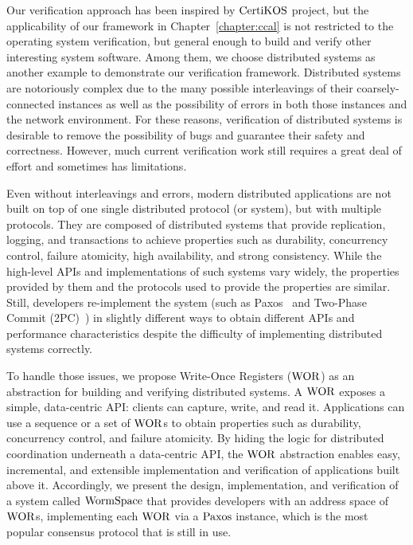 
Our verification approach has been inspired by $\mathrm{CertiKOS}$ project,
but the applicability of our framework in Chapter~\ref{chapter:ccal} is not restricted to the operating system verification, but general enough
to build and verify other interesting system software. 
Among them, we choose distributed systems as another example to demonstrate our 
verification framework.
Distributed systems are notoriously complex due to the many possible interleavings of their coarsely-connected 
instances as well as the possibility of errors in both those instances and the network environment. 
For these reasons, verification of distributed systems is desirable to remove the possibility of bugs and guarantee their safety and correctness. 
However, much current verification work still requires a great deal of effort and sometimes has limitations.

Even without interleavings and errors, 
modern distributed applications are not built on top of one single distributed protocol (or system), but with multiple protocols.
They are composed of distributed systems that provide replication, 
logging, and transactions to achieve properties such as durability, concurrency control, failure atomicity, high availability, and strong consistency.
While the high-level APIs and implementations of such systems vary widely, 
the properties provided by them and the protocols used to provide the properties are similar. 
Still, developers re-implement the system (such as Paxos~\cite{paxos} and 
Two-Phase Commit (2PC)~\cite{2PC}) in slightly different ways to obtain different APIs and performance 
characteristics despite the difficulty of implementing distributed systems correctly.

To handle those issues, we propose Write-Once Registers ($\mathrm{WOR}$) as an abstraction for building and verifying distributed systems. 
A $\mathrm{WOR}$ exposes a simple, data-centric API: 
clients can capture, write, and read it. 
Applications can use a sequence or a set of $\mathrm{WOR}$s to obtain properties such as durability, concurrency control, and failure atomicity. 
By hiding the logic for distributed coordination underneath a data-centric API, the $\mathrm{WOR}$ abstraction enables easy, incremental, 
and extensible implementation and verification of applications built above it. 
Accordingly, we present the design, implementation, and verification of a system called $\mathrm{WormSpace}$ 
that provides developers with an address space of $\mathrm{WOR}$s, implementing each $\mathrm{WOR}$ via a $\mathrm{Paxos}$ instance,
which is the most popular consensus protocol that is still in use. 

